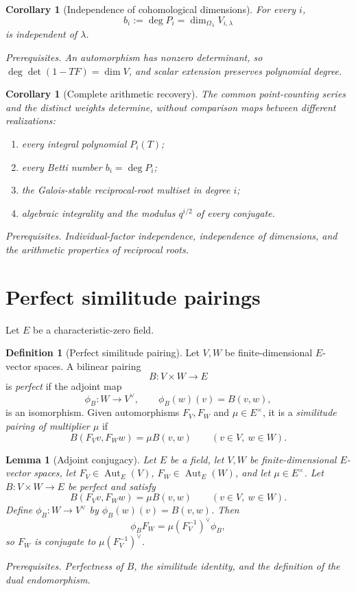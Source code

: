 \documentclass[10pt]{article}
\newtheorem{corollary}[theorem]{Corollary}
\newtheorem{lemma}[theorem]{Lemma}
\theoremstyle{definition}
\newtheorem{definition}[theorem]{Definition}
\newcommand{\deps}[1]{\par\smallskip\noindent\textit{Prerequisites.} #1}
\begin{document}
\begin{corollary}[Independence of cohomological dimensions]
For every \(i\),
\[
 b_i:=\deg P_i=\dim_{\Omega_\lambda}V_{i,\lambda}
\]
is independent of \(\lambda\).
\deps{An automorphism has nonzero determinant, so
\(\deg\det(1-TF)=\dim V\), and scalar extension preserves polynomial
degree.}
\end{corollary}

\begin{corollary}[Complete arithmetic recovery]
The common point-counting series and the distinct weights determine, without
comparison maps between different realizations:
\begin{enumerate}[label=\textup{(\roman*)}]
\item every integral polynomial \(P_i(T)\);
\item every Betti number \(b_i=\deg P_i\);
\item the Galois-stable reciprocal-root multiset in degree \(i\);
\item algebraic integrality and the modulus \(q^{i/2}\) of every conjugate.
\end{enumerate}
\deps{Individual-factor independence, independence of dimensions, and the
arithmetic properties of reciprocal roots.}
\end{corollary}

\section{Perfect similitude pairings}

Let \(E\) be a characteristic-zero field.

\begin{definition}[Perfect similitude pairing]
Let \(V,W\) be finite-dimensional \(E\)-vector spaces.  A bilinear pairing
\[
 B:V\times W\longrightarrow E
\]
is \emph{perfect} if the adjoint map
\[
 \phi_B:W\longrightarrow V^\vee,
 \qquad \phi_B(w)(v)=B(v,w),
\]
is an isomorphism.  Given automorphisms \(F_V,F_W\) and
\(\mu\in E^\times\), it is a \emph{similitude pairing of multiplier
\(\mu\)} if
\[
 B(F_Vv,F_Ww)=\mu B(v,w)
 \qquad(v\in V,\ w\in W).
\]
\end{definition}

\begin{lemma}[Adjoint conjugacy]
Let \(E\) be a field, let \(V,W\) be finite-dimensional \(E\)-vector
spaces, let \(F_V\in\operatorname{Aut}_E(V)\),
\(F_W\in\operatorname{Aut}_E(W)\), and let \(\mu\in E^\times\).  Let
\(B:V\times W\to E\) be perfect and satisfy
\[
 B(F_Vv,F_Ww)=\mu B(v,w)
 \qquad(v\in V,\ w\in W).
\]
Define \(\phi_B:W\to V^\vee\) by \(\phi_B(w)(v)=B(v,w)\).  Then
\[
 \phi_BF_W
 =\mu(F_V^{-1})^\vee\phi_B,
\]
so \(F_W\) is conjugate to
\(\mu(F_V^{-1})^\vee\).
\deps{Perfectness of \(B\), the similitude identity, and the definition of
the dual endomorphism.}
\end{lemma}
\end{document}
